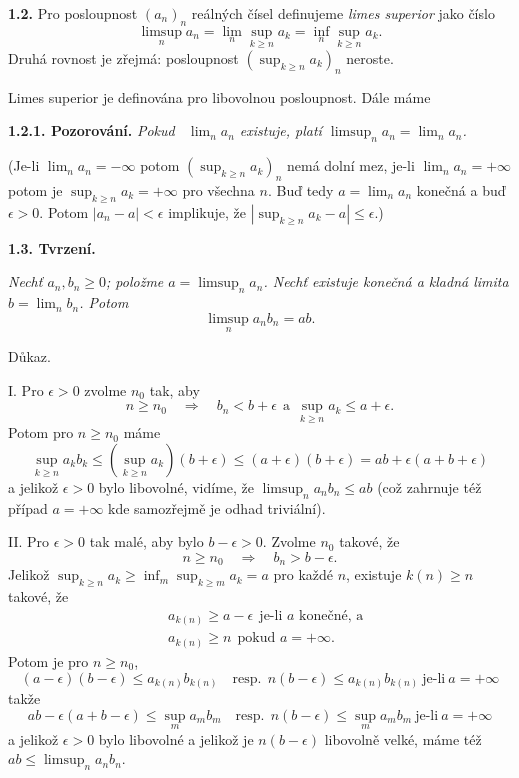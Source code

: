 \documentclass[12pt]{article}
\begin{document}
 \bigskip
 
 {\bf 1.2.} Pro posloupnost $(a_n)_n$ reálných čísel definujeme  {\em limes superior} jako číslo
 $$
 \limsup_na_n= \lim_n\sup_{k\geq n}a_k=\inf_n\sup_{k\geq n}a_k.
 $$
 Druhá rovnost je zřejmá: posloupnost $(\sup_{k\geq n}a_k)_n$ neroste.
 
 \medskip
 
 Limes superior je definována pro libovolnou posloupnost. Dále máme
 
 \medskip
 
 {\bf 1.2.1. Pozorování.} {\em Pokud \ $\lim_na_n$ existuje, platí $\limsup_na_n=\lim_na_n$.}
 
 (Je-li $\lim_na_n=-\infty$ potom $(\sup_{k\geq n}a_k)_n$ nemá dolní mez, je-li
 $\lim_na_n=+\infty$ potom je $\sup_{k\geq n}a_k=+\infty$ pro všechna $n$. Buď tedy $a=\lim_na_n$ konečná a buď $\epsilon>0$. Potom $|a_n-a|<\epsilon$ implikuje, že $|\sup_{k\geq n}a_k-a|\leq \epsilon$.)
 
 \bigskip
 
 {\bf 1.3. Tvrzení.} {\em Nechť $a_n, b_n\geq 0$; položme $a=\limsup_na_n$. Nechť existuje konečná a kladná limita   $b=\lim_nb_n$.
  Potom
  $$
  \limsup_na_nb_n =ab.
  $$
  
  Důkaz.} I. Pro $\epsilon>0$ zvolme $n_0$ tak, aby
  $$
  n\geq n_0\quad\Rightarrow\quad  b_n<b+\epsilon\ \ \text{a}\ \ \sup_{k\geq n}a_k\leq a+\epsilon.
  $$
  Potom pro $n\geq n_0$ máme
  $$
  \sup_{k\geq n}a_kb_k\leq (\sup_{k\geq n}a_k)(b+\epsilon)\leq (a+\epsilon)(b+\epsilon)=ab+\epsilon(a+b+\epsilon)
  $$
  a jelikož $\epsilon>0$ bylo libovolné, vidíme, že $\limsup_na_nb_n\leq ab$ (což zahrnuje též případ $a=+\infty$ kde samozřejmě je odhad triviální).
  
  \smallskip
  
  II. Pro $\epsilon>0$ tak malé, aby bylo $b-\epsilon>0$.
 Zvolme $n_0$ takové, že
  $$
  n\geq n_0\quad\Rightarrow\quad  b_n>b-\epsilon.
  $$
  Jelikož  $\sup_{k\geq n}a_k\geq\inf_m\sup_{k\geq m}a_k=a$ pro každé $n$, existuje $k(n)\geq n$ takové, že
  $$
  \begin{aligned}
  &a_{k(n)}\geq a-\epsilon \ \ \text{je-li $a$ konečné, a}\\
  &a_{k(n)}\geq n \ \ \text{pokud $a=+\infty$.}
  \end{aligned}
  $$
  Potom je pro $n\geq n_0$,
  $$
  (a-\epsilon)(b-\epsilon)\leq a_{k(n)}b_{k(n)}\quad\text{resp.}\ \ n(b-\epsilon)\leq a_{k(n)}b_{k(n)}\ \text{je-li} \ a=+\infty
  $$
  takže
   $$
  ab-\epsilon(a+b-\epsilon)\leq \sup_ma_{m}b_{m}\quad\text{resp.}\ \ n(b-\epsilon)\leq \sup_ma_{m}b_{m}\
  \text{je-li} \ a=+\infty
  $$
  a jelikož $\epsilon>0$ bylo libovolné a jelikož je $n(b-\epsilon)$ libovolně velké,
   máme též $ab\leq\limsup_na_nb_n$. \sq
   
\end{document}
